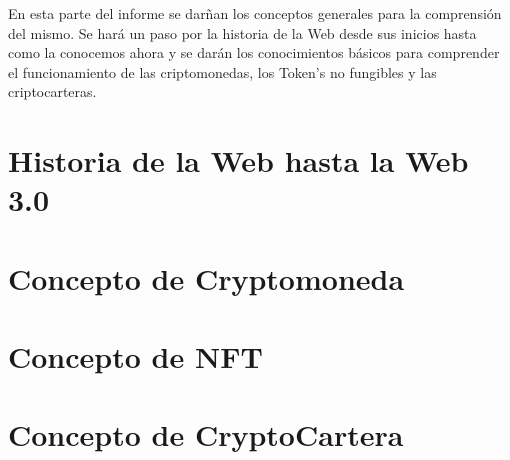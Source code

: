 En esta parte del informe se darñan los conceptos generales para la comprensión del mismo.
Se hará un paso por la historia de la Web desde sus inicios hasta como la conocemos ahora 
y se darán los conocimientos básicos para comprender el funcionamiento de las criptomonedas,
los Token's no fungibles y las criptocarteras.
\section{Historia de la Web hasta la Web 3.0}

\section{Concepto de Cryptomoneda}

\section{Concepto de NFT}

\newpage
\section{Concepto de CryptoCartera}
